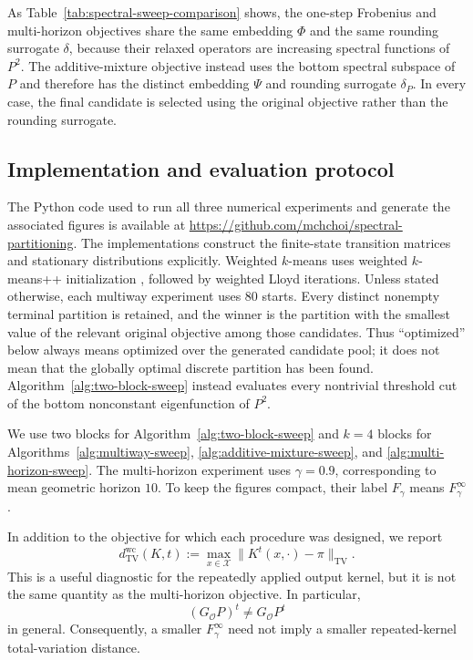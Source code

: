 \documentclass[11pt]{article}
\newcommand{\1}{\mathbf{1}}
\newcommand{\X}{\mathcal{X}}
\begin{document}
As Table~\ref{tab:spectral-sweep-comparison} shows, the one-step
Frobenius and multi-horizon objectives share the same embedding
$\Phi$ and the same rounding surrogate $\delta$, because their
relaxed operators are increasing spectral functions of $P^2$.
The additive-mixture objective instead uses the bottom spectral subspace of
$P$ and therefore has the distinct embedding $\Psi$ and rounding
surrogate $\delta_P$.  In every case, the final candidate is selected
using the original objective rather than the rounding surrogate.

\subsection{Implementation and evaluation protocol}
\label{subsec:numerical-protocol}

The Python code used to run all three numerical experiments and
generate the associated figures is available at
\url{https://github.com/mchchoi/spectral-partitioning}.  The
implementations construct the finite-state transition matrices and
stationary distributions explicitly.  Weighted $k$-means uses
weighted $k$-means++ initialization
\citep{ArthurVassilvitskii2007}, followed by weighted Lloyd
iterations.  Unless stated otherwise, each multiway experiment uses
$80$ starts.  Every distinct nonempty terminal partition is retained,
and the winner is the partition with the smallest value of the
relevant original objective among those candidates.  Thus
``optimized'' below always means optimized over the generated
candidate pool; it does not mean that the globally optimal discrete
partition has been found.  Algorithm~\ref{alg:two-block-sweep}
instead evaluates every nontrivial threshold cut of the bottom
nonconstant eigenfunction of $P^2$.

We use two blocks for Algorithm~\ref{alg:two-block-sweep} and $k=4$ blocks
for Algorithms~\ref{alg:multiway-sweep},
\ref{alg:additive-mixture-sweep}, and
\ref{alg:multi-horizon-sweep}.  The multi-horizon experiment uses
$\gamma=0.9$, corresponding to mean geometric horizon $10$.  To keep
the figures compact, their label
$F_\gamma$ means $F_\gamma^\infty$.  

In addition to the objective for which each procedure was designed, we
report
\begin{equation}
    d_{\mathrm{TV}}^{\mathrm{wc}}(K,t)
    :=\max_{x\in\X}
      \|K^t(x,\cdot)-\pi\|_{\mathrm{TV}}.
    \label{eq:worst-case-TV}
\end{equation}
This is a useful diagnostic for the repeatedly applied output kernel,
but it is not the same quantity as the multi-horizon objective.  In
particular,
\[
    (G_{\mathcal O}P)^t
    \ne G_{\mathcal O}P^t
\]
in general.  Consequently, a smaller $F_\gamma^\infty$ need not imply
a smaller repeated-kernel total-variation distance.
\end{document}
